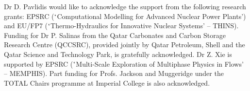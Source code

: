 \documentclass[preprint,authoryear,12pt]{elsarticle}
\begin{document}
\ack 
Dr D. Pavlidis would like to acknowledge the support from the following research grants: EPSRC ($\lq$Computational Modelling for Advanced Nuclear Power Plants') and EU/FP7 ($\lq$Thermo-Hydraulics for Innovative Nuclear Systems' -- THINS). Funding for Dr P. Salinas from the Qatar Carbonates and Carbon Storage Research Centre (QCCSRC), provided jointly by Qatar Petroleum, Shell and the Qatar Science and Technology Park, is gratefully acknowledged. Dr Z. Xie is supported by EPSRC ($\lq$Multi-Scale Exploration of Multiphase Physics in Flows' -- MEMPHIS). Part funding for Profs. Jackson and Muggeridge under the TOTAL Chairs programme at Imperial College is also acknowledged. 







\pagebreak
\clearpage

\listoffigures
\pagebreak
\clearpage


%
\end{document}
